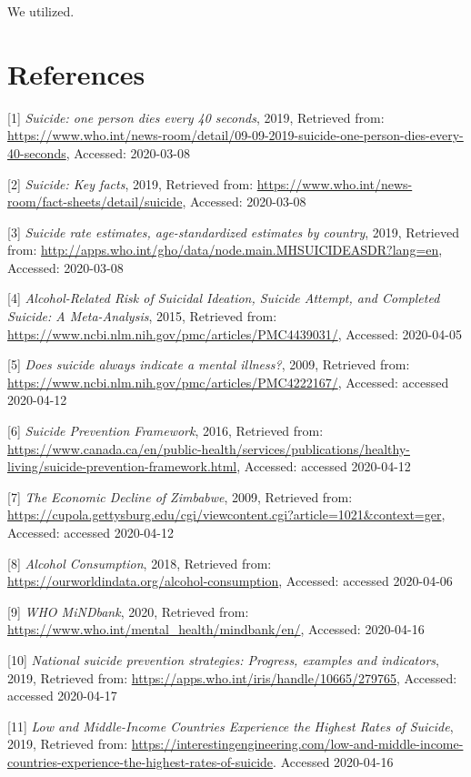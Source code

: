 \documentclass[]{article}
\begin{document}
We utilized.

\newpage 

\section{References}\label{references}

{[}1{]} \emph{Suicide: one person dies every 40 seconds}, 2019,
Retrieved from:
\url{https://www.who.int/news-room/detail/09-09-2019-suicide-one-person-dies-every-40-seconds},
Accessed: 2020-03-08

{[}2{]} \emph{Suicide: Key facts}, 2019, Retrieved from:
\url{https://www.who.int/news-room/fact-sheets/detail/suicide},
Accessed: 2020-03-08

{[}3{]} \emph{Suicide rate estimates, age-standardized estimates by
country}, 2019, Retrieved from:
\url{http://apps.who.int/gho/data/node.main.MHSUICIDEASDR?lang=en},
Accessed: 2020-03-08

{[}4{]} \emph{Alcohol-Related Risk of Suicidal Ideation, Suicide
Attempt, and Completed Suicide: A Meta-Analysis}, 2015, Retrieved from:
\url{https://www.ncbi.nlm.nih.gov/pmc/articles/PMC4439031/}, Accessed:
2020-04-05

{[}5{]} \emph{Does suicide always indicate a mental illness?}, 2009,
Retrieved from:
\url{https://www.ncbi.nlm.nih.gov/pmc/articles/PMC4222167/}, Accessed:
accessed 2020-04-12

{[}6{]} \emph{Suicide Prevention Framework}, 2016, Retrieved from:
\url{https://www.canada.ca/en/public-health/services/publications/healthy-living/suicide-prevention-framework.html},
Accessed: accessed 2020-04-12

{[}7{]} \emph{The Economic Decline of Zimbabwe}, 2009, Retrieved from:
\url{https://cupola.gettysburg.edu/cgi/viewcontent.cgi?article=1021\&context=ger},
Accessed: accessed 2020-04-12

{[}8{]} \emph{Alcohol Consumption}, 2018, Retrieved from:
\url{https://ourworldindata.org/alcohol-consumption}, Accessed: accessed
2020-04-06

{[}9{]} \emph{WHO MiNDbank}, 2020, Retrieved from:
\url{https://www.who.int/mental_health/mindbank/en/}, Accessed:
2020-04-16

{[}10{]} \emph{National suicide prevention strategies: Progress,
examples and indicators}, 2019, Retrieved from:
\url{https://apps.who.int/iris/handle/10665/279765}, Accessed: accessed
2020-04-17

{[}11{]} \emph{Low and Middle-Income Countries Experience the Highest
Rates of Suicide}, 2019, Retrieved from:
\url{https://interestingengineering.com/low-and-middle-income-countries-experience-the-highest-rates-of-suicide}.
Accessed 2020-04-16
\end{document}
